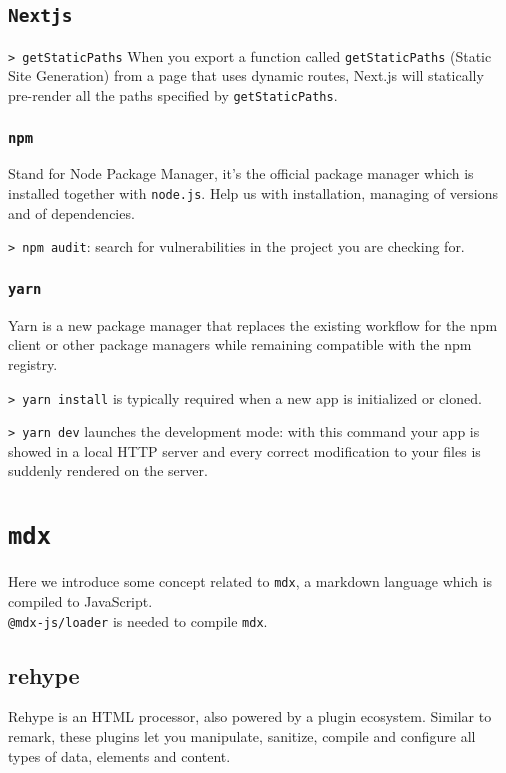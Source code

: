 \documentclass[11pt]{article}
\newcommand{\cmd}[1]{\colorbox{light-gray}{\textcolor{gio}{\texttt{#1}}}}
\begin{document}
\begin{multicols}{2}
\subsection{\texttt{Nextjs}}

\cmd{> getStaticPaths} When you export a function called \texttt{getStaticPaths} 
(Static Site Generation) from a page that uses dynamic routes, Next.js will 
statically pre-render all the paths specified by \texttt{getStaticPaths}.

\subsubsection{\texttt{npm}}
Stand for Node Package Manager, it's the official package manager which is 
installed together with \texttt{node.js}. Help us with installation, managing of 
versions and of dependencies.

\cmd{> npm audit}: search for vulnerabilities in the project you are checking for.

\subsubsection{\texttt{yarn}}

Yarn is a new package manager that replaces the existing workflow for the npm 
client or other package managers while remaining compatible with the npm registry. 

\cmd{> yarn install} is typically required when a new app is initialized or cloned.

\cmd{> yarn dev} launches the development mode: with this command your app is
showed in a local HTTP server and every correct modification to your files is
suddenly rendered on the server.

\section{\texttt{mdx}}

Here we introduce some concept related to \texttt{mdx}, a markdown language which 
is compiled to JavaScript. \\

\cmd{@mdx-js/loader} is needed to compile \texttt{mdx}.

\subsection{rehype}

Rehype is an HTML processor, also powered by a plugin ecosystem. Similar to remark, 
these plugins let you manipulate, sanitize, compile and configure all types of data, 
elements and content.


\end{multicols}
\end{document}
